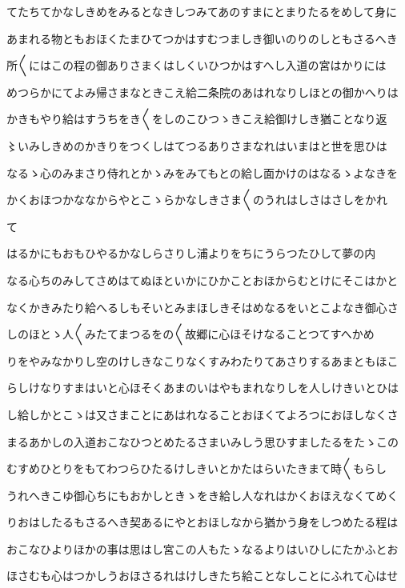 \documentclass[a4paper,11pt,landscape]{ltjtarticle}
\begin{document}
てたちてかなしきめをみるとなきしつみてあのすまにとまりたるをめして身に
\par\medskip
あまれる物ともおほくたまひてつかはすむつましき御いのりのしともさるへき
\par\medskip
所〱にはこの程の御ありさまくはしくいひつかはすへし入道の宮はかりには
\par\medskip
めつらかにてよみ帰さまなときこえ給二条院のあはれなりしほとの御かへりは
\par\medskip
かきもやり給はすうちをき〱をしのこひつゝきこえ給御けしき猶ことなり返
\par\medskip
〻いみしきめのかきりをつくしはてつるありさまなれはいまはと世を思ひは
\par\medskip
なるゝ心のみまさり侍れとかゝみをみてもとの給し面かけのはなるゝよなきを
\par\medskip
かくおほつかななからやとこゝらかなしきさま〱のうれはしさはさしをかれ
\par\medskip
て
\par\medskip
はるかにもおもひやるかなしらさりし浦よりをちにうらつたひして夢の内
\par\medskip
なる心ちのみしてさめはてぬほといかにひかことおほからむとけにそこはかと
\par\medskip
なくかきみたり給へるしもそいとみまほしきそはめなるをいとこよなき御心さ
\par\medskip
しのほとゝ人〱みたてまつるをの〱故郷に心ほそけなることつてすへかめ
\par\medskip
りをやみなかりし空のけしきなこりなくすみわたりてあさりするあまともほこ
\par\medskip
らしけなりすまはいと心ほそくあまのいはやもまれなりしを人しけきいとひは
\par\medskip
し給しかとこゝは又さまことにあはれなることおほくてよろつにおほしなくさ
\par\medskip
まるあかしの入道おこなひつとめたるさまいみしう思ひすましたるをたゝこの
\par\medskip
むすめひとりをもてわつらひたるけしきいとかたはらいたきまて時〱もらし
\par\medskip
うれへきこゆ御心ちにもおかしときゝをき給し人なれはかくおほえなくてめく
\par\medskip
りおはしたるもさるへき契あるにやとおほしなから猶かう身をしつめたる程は
\par\medskip
おこなひよりほかの事は思はし宮この人もたゝなるよりはいひしにたかふとお
\par\medskip
ほさむも心はつかしうおほさるれはけしきたち給ことなしことにふれて心はせ
\par\medskip
\end{document}
